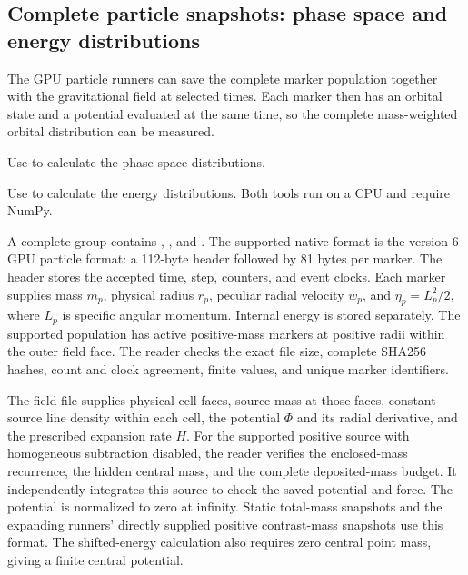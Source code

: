 \subsection{Complete particle snapshots: phase space and energy distributions}
\label{sec:complete-particle-analysis}

The GPU particle runners can save the complete marker population together
with the gravitational field at selected times. Each marker then has an orbital state and a potential evaluated at the
same time, so the complete mass-weighted orbital distribution can be measured.

Use  to calculate the
phase space distributions.

Use  to calculate the
energy distributions. Both tools run on a CPU and require NumPy.

A complete group contains , , and
. The supported native format is the version-6 GPU
particle format: a 112-byte header followed by 81 bytes per marker. The
header stores the accepted time, step, counters, and event clocks. Each
marker supplies mass $m_p$, physical radius $r_p$, peculiar radial
velocity $w_p$, and $\eta_p=L_p^2/2$, where $L_p$ is specific angular
momentum. Internal energy is stored separately. The supported population
has active positive-mass markers at positive radii within the outer field
face. The reader checks the exact file size, complete SHA256 hashes,
count and clock agreement, finite values, and unique marker identifiers.

The field file supplies physical cell faces, source mass at those faces,
constant source line density within each cell, the potential $\Phi$ and
its radial derivative, and the prescribed expansion rate $H$. For the
supported positive source with homogeneous subtraction disabled, the
reader verifies the enclosed-mass recurrence, the hidden central mass,
and the complete deposited-mass budget. It independently integrates this
source to check the saved potential and force. The potential is normalized
to zero at infinity. Static total-mass snapshots and the expanding
runners' directly supplied positive contrast-mass snapshots use this
format. The shifted-energy calculation also requires zero central point
mass, giving a finite central potential.

